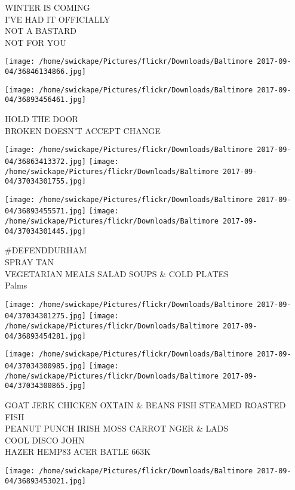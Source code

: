 \documentclass[10pt,letterpaper]{article}
\begin{document}
WINTER IS COMING\\
I'VE HAD IT OFFICIALLY\\
NOT A BASTARD\\
NOT FOR YOU\\
\pagebreak

\texttt{[image: /home/swickape/Pictures/flickr/Downloads/Baltimore 2017-09-04/36846134866.jpg]}

\vspace{0.25in}
\texttt{[image: /home/swickape/Pictures/flickr/Downloads/Baltimore 2017-09-04/36893456461.jpg]}

HOLD THE DOOR\\
BROKEN DOESN'T ACCEPT CHANGE\\
\pagebreak

\texttt{[image: /home/swickape/Pictures/flickr/Downloads/Baltimore 2017-09-04/36863413372.jpg]}
\texttt{[image: /home/swickape/Pictures/flickr/Downloads/Baltimore 2017-09-04/37034301755.jpg]}

\texttt{[image: /home/swickape/Pictures/flickr/Downloads/Baltimore 2017-09-04/36893455571.jpg]}
\texttt{[image: /home/swickape/Pictures/flickr/Downloads/Baltimore 2017-09-04/37034301445.jpg]}

\#DEFENDDURHAM\\
SPRAY TAN\\
VEGETARIAN MEALS SALAD SOUPS \& COLD PLATES\\
Palms\\
\pagebreak

\texttt{[image: /home/swickape/Pictures/flickr/Downloads/Baltimore 2017-09-04/37034301275.jpg]}
\texttt{[image: /home/swickape/Pictures/flickr/Downloads/Baltimore 2017-09-04/36893454281.jpg]}

\texttt{[image: /home/swickape/Pictures/flickr/Downloads/Baltimore 2017-09-04/37034300985.jpg]}
\texttt{[image: /home/swickape/Pictures/flickr/Downloads/Baltimore 2017-09-04/37034300865.jpg]}

GOAT JERK CHICKEN OXTAIN \& BEANS FISH STEAMED ROASTED FISH\\
PEANUT PUNCH IRISH MOSS CARROT NGER \& LADS\\
COOL DISCO JOHN\\
HAZER HEMP83 ACER BATLE 663K\\
\pagebreak

\texttt{[image: /home/swickape/Pictures/flickr/Downloads/Baltimore 2017-09-04/36893453021.jpg]}
\end{document}
